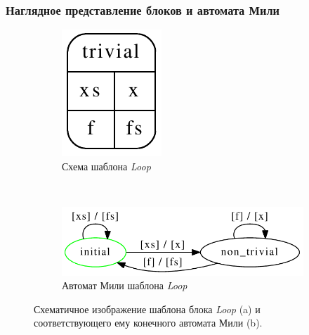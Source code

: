 \documentclass[10pt,pdf,hyperref={unicode}]{beamer}
\begin{document}
\begin{frame}
  \frametitle{Наглядное представление блоков и автомата Мили}
  \begin{figure}[H]
  \centering

  \begin{subfigure}[b]{0.2\textwidth}
    \centering
    \includegraphics[width=\textwidth]{map_cg.pdf}
    \caption{Схема шаблона \textit{Loop}}
    \label{map:connection}
  \end{subfigure}
  ~
  \begin{subfigure}[b]{0.7\textwidth}
    \centering
    \includegraphics[width=\textwidth]{map_fa.pdf}
    \caption{Автомат Мили шаблона \textit{Loop}}
    \label{map:fa}
  \end{subfigure}
  
  \caption{Схематичное изображение шаблона блока \textit{Loop} (a) и соответствующего ему конечного автомата Мили (b).}
  \label{map}
\end{figure}
\end{frame}
\end{document}
